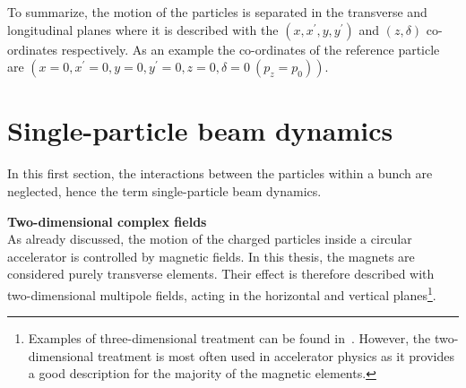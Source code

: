 

To summarize, the motion of the particles is separated in the transverse and longitudinal planes where it is described with the  $(x, x^\prime, y, y^\prime)$ and $(z, \delta)$ co-ordinates respectively. As an example the co-ordinates of the reference particle are $(x=0, x^\prime=0, y=0, y^\prime = 0, z=0, \delta=0 \ (p_z=p_0))$.

\section{Single-particle beam dynamics}
In this first section, the interactions between the particles within a bunch are neglected, hence the term single-particle beam dynamics.

\textbf{Two-dimensional complex fields}\\
As already discussed, the motion of the charged particles inside a circular accelerator is controlled by magnetic fields. In this thesis, the magnets are considered purely transverse elements. Their effect is therefore described with two-dimensional multipole fields, acting in the horizontal and vertical planes\footnote{Examples of three-dimensional treatment can be found in~\cite{wolski2014, Beth:889480}. However, the two-dimensional treatment is most often used in accelerator physics as it provides a good description for the majority of the magnetic elements.}. %

